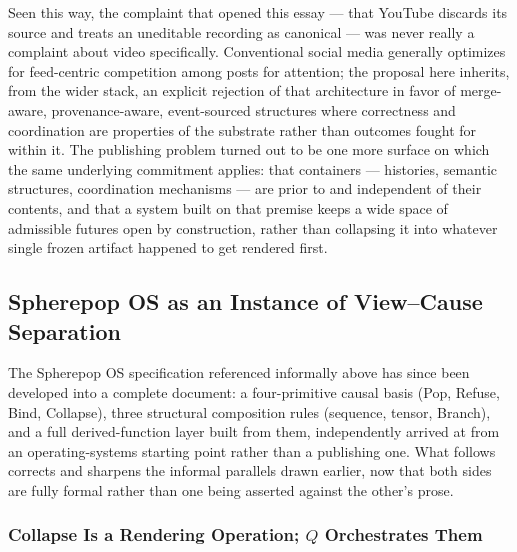 \documentclass[11pt]{article}
\theoremstyle{definition}
\begin{document}
Seen this way, the complaint that opened this essay --- that YouTube discards its source and treats an uneditable recording as canonical --- was never really a complaint about video specifically. Conventional social media generally optimizes for feed-centric competition among posts for attention; the proposal here inherits, from the wider stack, an explicit rejection of that architecture in favor of merge-aware, provenance-aware, event-sourced structures where correctness and coordination are properties of the substrate rather than outcomes fought for within it. The publishing problem turned out to be one more surface on which the same underlying commitment applies: that containers --- histories, semantic structures, coordination mechanisms --- are prior to and independent of their contents, and that a system built on that premise keeps a wide space of admissible futures open by construction, rather than collapsing it into whatever single frozen artifact happened to get rendered first.

\subsection{Spherepop OS as an Instance of View--Cause Separation}
\label{sec:spherepop-os-connective}

The Spherepop OS specification referenced informally above has since been developed into a complete document: a four-primitive causal basis (Pop, Refuse, Bind, Collapse), three structural composition rules (sequence, tensor, Branch), and a full derived-function layer built from them, independently arrived at from an operating-systems starting point rather than a publishing one. What follows corrects and sharpens the informal parallels drawn earlier, now that both sides are fully formal rather than one being asserted against the other's prose.

\subsubsection{Collapse Is a Rendering Operation; $Q$ Orchestrates Them}
\end{document}
